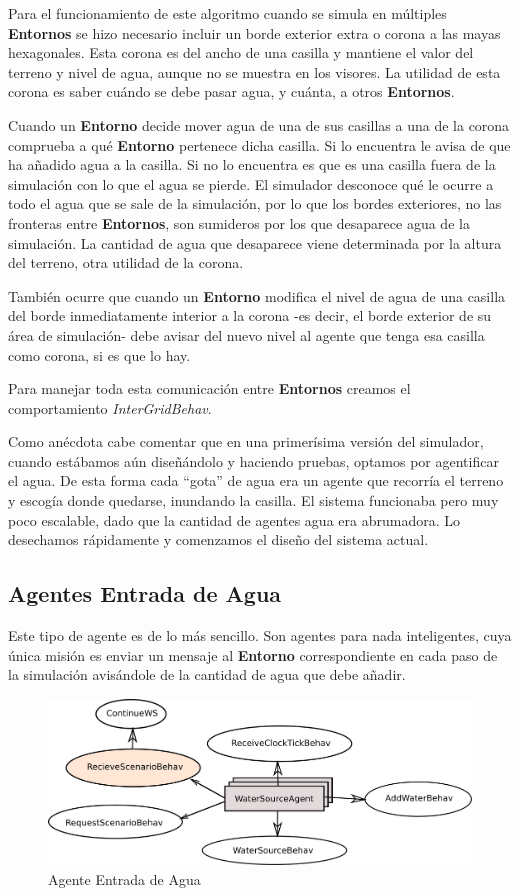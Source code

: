 Para el funcionamiento de este algoritmo cuando se simula en múltiples {\bf
Entornos} se hizo necesario incluir un borde exterior extra o corona a las mayas
hexagonales. Esta corona es del ancho de una casilla y mantiene el valor del
terreno y nivel de agua, aunque no se muestra en los visores. La utilidad de
esta corona es saber cuándo se debe pasar agua, y cuánta, a otros {\bf
Entornos}.

Cuando un {\bf Entorno} decide mover agua de una de sus casillas a una de la
corona comprueba a qué {\bf Entorno} pertenece dicha casilla. Si lo encuentra
le avisa de que ha añadido agua a la casilla. Si no lo encuentra es que es una
casilla fuera de la simulación con lo que el agua se pierde. El simulador
desconoce qué le ocurre a todo el agua que se sale de la simulación, por lo que
los bordes exteriores, no las fronteras entre {\bf Entornos}, son sumideros por
los que desaparece agua de la simulación. La cantidad de agua que desaparece
viene determinada por la altura del terreno, otra utilidad de la corona.

También ocurre que cuando un {\bf Entorno} modifica el nivel de agua de una
casilla del borde inmediatamente interior a la corona -es decir, el borde
exterior de su área de simulación- debe avisar del nuevo nivel al agente que
tenga esa casilla como corona, si es que lo hay.

Para manejar toda esta comunicación entre {\bf Entornos} creamos el
comportamiento {\em InterGridBehav}.

Como anécdota cabe comentar que en una primerísima versión del simulador,
cuando estábamos aún diseñándolo y haciendo pruebas, optamos por agentificar el
agua. De esta forma cada ``gota'' de agua era un agente que recorría el terreno
y escogía donde quedarse, inundando la casilla. El sistema funcionaba pero muy
poco escalable, dado que la cantidad de agentes agua era abrumadora. Lo
desechamos rápidamente y comenzamos el diseño del sistema actual.

\subsection*{Agentes Entrada de Agua}

Este tipo de agente es de lo más sencillo. Son agentes para nada inteligentes,
cuya única misión es enviar un mensaje al {\bf Entorno} correspondiente en cada
paso de la simulación avisándole de la cantidad de agua que debe añadir.

\begin{figure}[H]
 \centering
 \includegraphics[width=120mm]{figuras/cap5/ag_water_source.png}
 \caption{Agente Entrada de Agua}
\end{figure}


